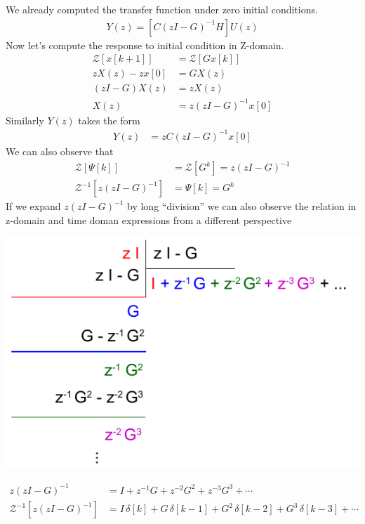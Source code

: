 \documentclass[twoside]{article}
\begin{document}
We already computed the transfer function under zero initial
conditions.
%
\begin{align*}
  Y(z) =  \left[ C \left(z I - G \right)^{-1} H  \right] U(z)
\end{align*}
%
Now let's compute the response to initial condition in Z-domain.
%
\begin{align*}
\mathcal{Z} \left[ x[k+1] \right] &= \mathcal{Z} \left[ G x[k] \right]
\\
z X(z) - z x[0] &= G X(z)
\\
\left( z I - G \right) X(z) &= z X(z) 
\\
X(z) &= z \left( z I - G \right)^{-1} x[0]
\end{align*}
%
Similarly $Y(z)$ takes the form
%
\begin{align*}
  Y(z) &= z C \left( z I - G \right)^{-1} x[0]
\end{align*}
%
We can also observe that
%
\begin{align*}
  \mathcal{Z} \left[ \Psi[k] \right] &= \mathcal{Z} [ G^k ] =
  z \left( z I - G \right)^{-1}
\\
  \mathcal{Z}^{-1} [   z \left( z I - G \right)^{-1} ] &= \Psi[k] = G^k
\end{align*}
%
If we expand $z \left( z I - G \right)^{-1}$ by long ``division'' we
can also observe the relation in z-domain and time doman expressions
from a different perspective
%
     \begin{center}
 \begin{minipage}[h]{0.5\linewidth}
     \begin{center}
       \includegraphics[width=\textwidth]{directdivision}
     \end{center}
 \end{minipage}
     \end{center}
%
\begin{align*}
z \left( z I - G \right)^{-1} &= I + z^{-1} G + z^{-2} G^2 + z^{-3} G^3
  + \cdots
\\
\mathcal{Z}^{-1} \left[ z \left( z I - G \right)^{-1} \right] &=
I \, \delta[k] + G \, \delta[k-1] + G^2 \, \delta[k-2] + G^3 \,
  \delta[k-3] + \cdots 
\end{align*}
%
\end{document}
